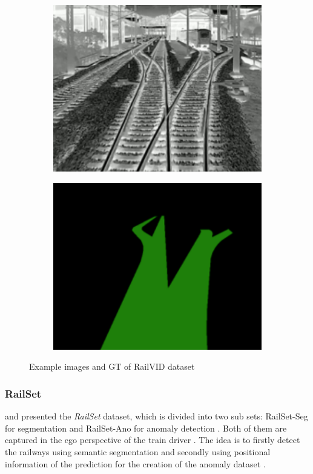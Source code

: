 \begin{figure}[ht]
\begin{subfigure}{0.24\textwidth}
        \includegraphics[width=\linewidth]{PICs/railVID_switch.png}
    \end{subfigure}
    \hfill
    \begin{subfigure}{0.24\textwidth}
        \centering
        \includegraphics[width=\linewidth]{PICs/railVID_switch_label.png}
    \end{subfigure}
    \caption{Example images and \ac{GT} of RailVID dataset \cite{yuan2022railvid}}
    \label{fig:railVID_dataset_images}
\end{figure}

\subsubsection{RailSet}
\cite{railSet2022} and \cite{hadded2022application} presented the \textit{RailSet} dataset, which is divided into two sub sets: RailSet-Seg for segmentation and RailSet-Ano for anomaly detection \cite{railSet2022}. Both of them are captured in the ego perspective of the train driver \cite{railSet2022} \cite{hadded2022application}. The idea is to firstly detect the railways using semantic segmentation and secondly using positional information of the prediction for the creation of the anomaly dataset \cite{railSet2022}.

